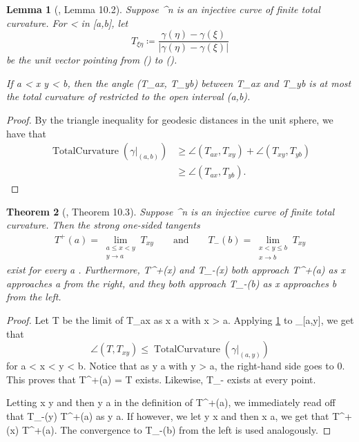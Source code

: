 \documentclass[a4paper, 11pt]{article}
\theoremstyle{plain}
\newtheorem{theorem}{Theorem}[section]
\newtheorem{lemma}[theorem]{Lemma}
\theoremstyle{definition}
\theoremstyle{remark}
\numberwithin{equation}{subsection}
\def\({}
\def\){}
\begin{document}
\begin{lemma}[{\cite{EWW02}, Lemma 10.2}]
\label{Existence of Strong One-sided Tangents}
Suppose \(\gamma \vcentcolon [a,b] \rightarrow {}^{n}\) is an injective curve of finite total curvature. For \(\xi < \eta\) in \([a,b]\), let
\[T_{\xi \eta} \coloneq \frac{\gamma(\eta) - \gamma(\xi)}{|\gamma(\eta) - \gamma(\xi)|}\]
be the unit vector pointing from \(\gamma(\xi)\) to \(\gamma(\eta)\).

If \(a < x \leqslant y < b\), then the angle \(\angle(T_{ax}, T_{yb})\) between \(T_{ax}\) and \(T_{yb}\) is at most the total curvature of \(\gamma\) restricted to the open interval \((a,b)\).
\end{lemma}

\begin{proof}
By the triangle inequality for geodesic distances in the unit sphere, we have that
\begin{align*}
\operatorname{TotalCurvature}(\gamma\vert_{(a,b)}) &\geqslant \angle(T_{ax}, T_{xy}) + \angle(T_{xy}, T_{yb}) \\
&\geqslant \angle(T_{ax}, T_{yb}).
\end{align*}
\end{proof}

\begin{theorem}[{\cite{EWW02}, Theorem 10.3}]
Suppose \(\gamma \vcentcolon [A,B] \rightarrow {}^{n}\) is an injective curve of finite total curvature. Then the strong one-sided tangents
\begin{gather}
T^{+}(a) = \lim_{\substack{a \leqslant x < y \\ y \rightarrow a}} T_{xy} \qquad \text{and} \qquad T_{-}(b) = \lim_{\substack{x < y \leqslant b \\ x \rightarrow b}} T_{xy}
\end{gather}
exist for every \(a \in [A, B)\) and every \(b \in (A,B]\). Furthermore, \(T^{+}(x)\) and \(T_{-}(x)\) both approach \(T^{+}(a)\) as \(x\) approaches \(a\) from the right, and they both approach \(T_{-}(b)\) as \(x\) approaches \(b\) from the left.
\end{theorem}

\begin{proof}
Let \(T\) be the limit of \(T_{ax}\) as \(x \rightarrow a\) with \(x > a\). Applying \cref{Existence of Strong One-sided Tangents} to \(\gamma \vert_{[a,y]}\), we get that
\begin{equation}
\angle(T, T_{xy}) \leqslant \operatorname{TotalCurvature}(\gamma \vert_{(a,y)})
\end{equation}
for \(a < x < y < b\). Notice that as \(y \rightarrow a\) with \(y > a\), the right-hand side goes to \(0\). This proves that \(T^{+}(a) = T\) exists. Likewise, \(T_{-}\) exists at every point.

Letting \(x \rightarrow y\) and then \(y \rightarrow a\) in the definition of \(T^{+}(a)\), we immediately read off that \(T_{-}(y) \rightarrow T^{+}(a)\) as \(y \rightarrow a\). If however, we let \(y \rightarrow x\) and then \(x \rightarrow a\), we get that \(T^{+}(x) \rightarrow T^{+}(a)\). The convergence to \(T_{-}(b)\) from the left is used analogously.
\end{proof}


\clearpage

\nocite{*}
\end{document}
